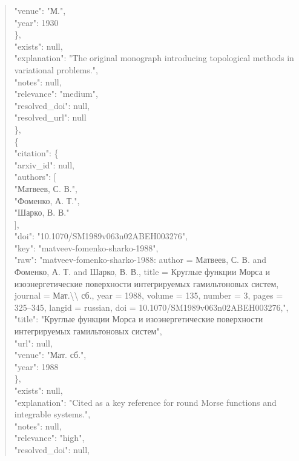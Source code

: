 \documentclass[11pt]{article}
\begin{document}
\begin{quote}
        "venue": "М.",\\
        "year": 1930\\
      \},\\
      "exists": null,\\
      "explanation": "The original monograph introducing topological methods in variational problems.",\\
      "notes": null,\\
      "relevance": "medium",\\
      "resolved\_doi": null,\\
      "resolved\_url": null\\
    \},\\
    \{\\
      "citation": \{\\
        "arxiv\_id": null,\\
        "authors": [\\
          "Матвеев, С. В.",\\
          "Фоменко, А. Т.",\\
          "Шарко, В. В."\\
        ],\\
        "doi": "10.1070/SM1989v063n02ABEH003276",\\
        "key": "matveev-fomenko-sharko-1988",\\
        "raw": "matveev-fomenko-sharko-1988: author = Матвеев, С. В. and Фоменко, А. Т. and Шарко, В. В., title = Круглые функции Морса и изоэнергетические поверхности интегрируемых гамильтоновых систем, journal = Мат.\textbackslash{}\textbackslash{} сб., year = 1988, volume = 135, number = 3, pages = 325--345, langid = russian, doi = 10.1070/SM1989v063n02ABEH003276,",\\
        "title": "Круглые функции Морса и изоэнергетические поверхности интегрируемых гамильтоновых систем",\\
        "url": null,\\
        "venue": "Мат. сб.",\\
        "year": 1988\\
      \},\\
      "exists": null,\\
      "explanation": "Cited as a key reference for round Morse functions and integrable systems.",\\
      "notes": null,\\
      "relevance": "high",\\
      "resolved\_doi": null,\\

\end{quote}
\end{document}
